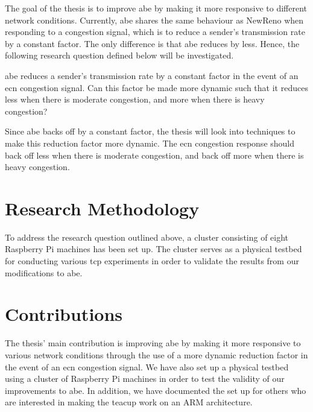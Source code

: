 The goal of the thesis is to improve \gls{abe} by making it more responsive to different network conditions. Currently, \gls{abe} shares the same behaviour as NewReno when responding to a congestion signal, which is to reduce a sender's transmission rate by a constant factor. The only difference is that \gls{abe} reduces by less. Hence, the following research question defined below will be investigated.

\begin{statement}
    \gls{abe} reduces a sender's transmission rate by a constant factor in the event of an \gls{ecn} congestion signal. Can this factor be made more dynamic such that it reduces less when there is moderate congestion, and more when there is heavy congestion?
\end{statement}

Since \gls{abe} backs off by a constant factor, the thesis will look into techniques to make this reduction factor more dynamic. The \gls{ecn} congestion response should back off less when there is moderate congestion, and back off more when there is heavy congestion.









\section{Research Methodology}

To address the research question outlined above, a cluster consisting of eight Raspberry Pi machines has been set up. The cluster serves as a physical testbed for conducting various \gls{tcp} experiments in order to validate the results from our modifications to \gls{abe}.









\section{Contributions}

The thesis' main contribution is improving \gls{abe} by making it more responsive to various network conditions through the use of a more dynamic reduction factor in the event of an \gls{ecn} congestion signal. We have also set up a physical testbed using a cluster of Raspberry Pi machines in order to test the validity of our improvements to \gls{abe}. In addition, we have documented the set up for others who are interested in making the \gls{teacup} work on an ARM architecture.









